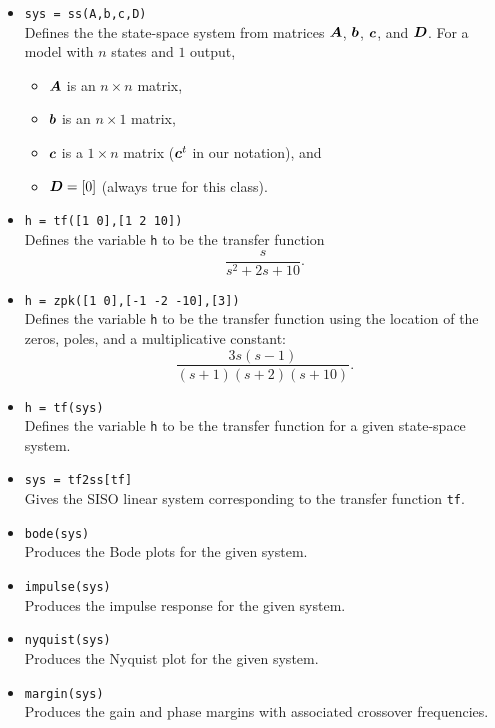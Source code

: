 \begin{itemize}
\item \verb|sys = ss(A,b,c,D)|\\
Defines the the state-space system from matrices $\boldsymbol{A}$\@, $\boldsymbol{b}$\@,
$\boldsymbol{c}$\@, and $\boldsymbol{D}$\@.  For a model with $n$ states and $1$ output,
\begin{itemize}
\item $\boldsymbol{A}$ is an $n\times n$ matrix,
\item $\boldsymbol{b}$ is an $n\times 1$ matrix,
\item $\boldsymbol{c}$ is a $1\times n$ matrix ($\boldsymbol{c}^{t}$ in our notation),
and
\item $\boldsymbol{D}=[0]$ (always true for this class).
\end{itemize}


\item \verb|h = tf([1 0],[1 2 10])|\\
Defines the variable \verb|h| to be the transfer function
\begin{equation*}
\frac{s}{s^{2}+2s+10}.
\end{equation*}

\item \verb|h = zpk([1 0],[-1 -2 -10],[3])|\\
Defines the variable \verb|h| to be the transfer function using the location
of the zeros, poles, and a multiplicative constant:
\begin{equation*}
\frac{3s(s-1)}{(s+1)(s+2)(s+10)}.
\end{equation*}

\item \verb|h = tf(sys)|\\
Defines the variable \verb|h| to be the transfer function for a given
state-space system.

\item \verb|sys = tf2ss[tf]|\\
Gives the SISO linear system corresponding to the transfer function \verb|tf|.

\item \verb|bode(sys)|\\
Produces the Bode plots for the given system.

\item \verb|impulse(sys)|\\
Produces the impulse response for the given system.

\item \verb|nyquist(sys)|\\
Produces the Nyquist plot for the given system.

\item \verb|margin(sys)|\\
Produces the gain and phase margins with associated crossover frequencies.
\end{itemize}

